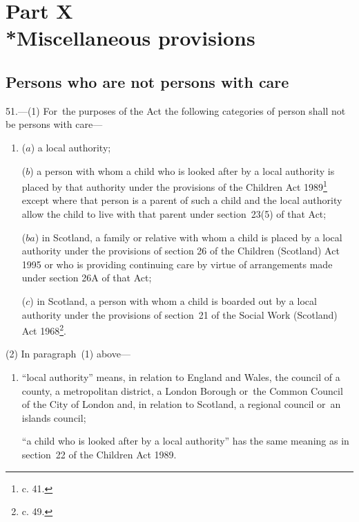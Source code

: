 \documentclass[a4paper,12pt]{article}
\begin{document}
\section[Part X --- Miscellaneous provisions]{Part X\\*Miscellaneous provisions}

\renewcommand\parthead{--- Part X}

\subsection[51. Persons who are not persons with care]{Persons who are not persons with care}

51.—(1) For~the purposes of the Act the following categories of person shall not be persons with care—
\begin{enumerate}\item[]
($a$) a local authority;

($b$) a person with whom a child who is looked after by a local authority is placed by that authority under the provisions of the Children Act 1989\footnote{ c. 41.}
except where that person is a parent of such a child and the local authority allow the child to live with that parent under section~23(5) of that Act;

($ba$) in Scotland, a family or relative with whom a child is placed by a local authority under the provisions of section 26 of the Children (Scotland) Act 1995 or who is providing continuing care by virtue of arrangements made under section 26A of that Act;


($c$) in Scotland, a person with whom a child is boarded out by a local authority under the provisions of section~21 of the Social Work (Scotland) Act 1968\footnote{ c. 49.}.
\end{enumerate}

(2) In paragraph~(1) above—
\begin{enumerate}\item[]
“local authority” means, in relation to England and Wales, the council of a county, a metropolitan district, a London Borough or~the Common Council of the City of London and, in relation to Scotland, a regional council or~an islands council;

“a child who is looked after by a local authority” has the same meaning as in section~22 of the Children Act 1989.
\end{enumerate}
\end{document}
